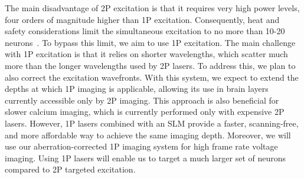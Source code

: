 

The main disadvantage of 2P excitation is that it requires very high power levels, four orders of magnitude higher than 1P excitation. Consequently, heat and safety considerations limit the simultaneous excitation to no more than 10-20 neurons~\cite{Davis2024Optical}. To bypass this limit, we aim to use 1P excitation. The main challenge with 1P excitation is that it relies on shorter wavelengths, which scatter much more than the longer wavelengths used by 2P lasers. To address this, we plan to also correct the excitation wavefronts. With this system, we expect to extend the depths at which 1P imaging is applicable, allowing its use in brain layers currently accessible only by 2P imaging. This approach is also beneficial for slower calcium imaging, which is currently performed only with expensive 2P lasers. However, 1P lasers combined with an SLM provide a faster, scanning-free, and more affordable way to achieve the same imaging depth. Moreover, we will use our aberration-corrected 1P imaging system for high frame rate voltage imaging. Using 1P lasers will enable us to target a much larger set of neurons compared to 2P targeted excitation.


